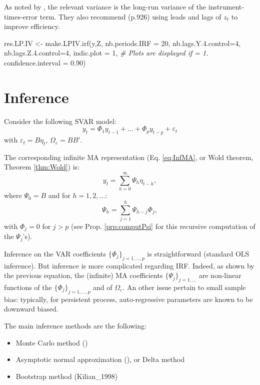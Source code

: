 \documentclass[
  12pt,
]{book}
\newenvironment{Shaded}{\begin{snugshade}}{\end{snugshade}}
\newcommand{\AttributeTok}[1]{\textcolor[rgb]{0.77,0.63,0.00}{#1}}
\newcommand{\CommentTok}[1]{\textcolor[rgb]{0.56,0.35,0.01}{\textit{#1}}}
\newcommand{\DecValTok}[1]{\textcolor[rgb]{0.00,0.00,0.81}{#1}}
\newcommand{\FloatTok}[1]{\textcolor[rgb]{0.00,0.00,0.81}{#1}}
\newcommand{\FunctionTok}[1]{\textcolor[rgb]{0.00,0.00,0.00}{#1}}
\newcommand{\NormalTok}[1]{#1}
\newcommand{\OtherTok}[1]{\textcolor[rgb]{0.56,0.35,0.01}{#1}}
\providecommand{\tightlist}{%
  \setlength{\itemsep}{0pt}\setlength{\parskip}{0pt}}
\theoremstyle{definition}
\theoremstyle{definition}
\theoremstyle{definition}
\theoremstyle{definition}
\theoremstyle{remark}
\begin{document}
As noted by \citet{Stock_Watson_2018}, the relevant variance is the long-run variance of the instrument-times-error term. They also recommend (p.926) using leads and lags of \(z_t\) to improve efficiency.

\begin{Shaded}
\begin{Highlighting}[]
\NormalTok{res.LP.IV }\OtherTok{\textless{}{-}} \FunctionTok{make.LPIV.irf}\NormalTok{(y,Z,}
                           \AttributeTok{nb.periods.IRF =} \DecValTok{20}\NormalTok{,}
                           \AttributeTok{nb.lags.Y.4.control=}\DecValTok{4}\NormalTok{,}
                           \AttributeTok{nb.lags.Z.4.control=}\DecValTok{4}\NormalTok{,}
                           \AttributeTok{indic.plot =} \DecValTok{1}\NormalTok{, }\CommentTok{\# Plots are displayed if = 1.}
                           \AttributeTok{confidence.interval =} \FloatTok{0.90}\NormalTok{)}
\end{Highlighting}
\end{Shaded}

\hypertarget{Inference}{%
\chapter{Inference}\label{Inference}}

Consider the following SVAR model:
\[y_t = \Phi_1 y_{t-1} + \dots + \Phi_p y_{t-p} + \varepsilon_t\]
with \(\varepsilon_t=B\eta_t\), \(\Omega_\varepsilon=BB'\).

The corresponding infinite MA representation (Eq. \eqref{eq:InfMA}, or Wold theorem, Theorem \ref{thm:Wold}) is:
\[
y_t = \sum_{h=0}^\infty\Psi_h \eta_{t-h},
\]
where \(\Psi_0=B\) and for \(h=1,2,\dots\):
\[
\Psi_h = \sum_{j=1}^h\Psi_{h-j}\Phi_j,
\]
with \(\Phi_j=0\) for \(j>p\) (see Prop. \ref{prp:computPsi} for this recursive computation of the \(\Psi_j\)'s).

Inference on the VAR coefficients \(\{\Phi_j\}_{j=1,...,p}\) is straightforward (standard OLS inference). But inference is more complicated regarding IRF. Indeed, as shown by the previous equation, the (infinite) MA coefficients \(\{\Psi_j\}_{j=1,...}\) are non-linear functions of the \(\{\Phi_j\}_{j=1,...,p}\) and of \(\Omega_\varepsilon\). An other issue pertain to small sample bias: typically, for persistent process, auto-regressive parameters are known to be downward biased.

The main inference methods are the following:

\begin{itemize}
\tightlist
\item
  Monte Carlo method (\citet{Hamilton_1994})
\item
  Asymptotic normal approximation (\citet{Lutkepohl_1990}), or Delta method
\item
  Bootstrap method (Kilian\_1998)
\end{itemize}
\end{document}

